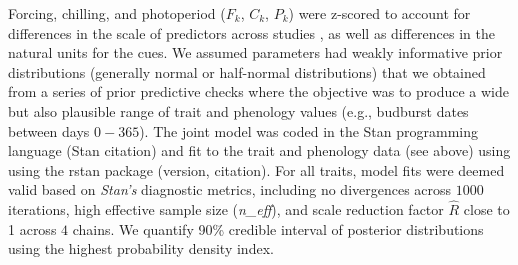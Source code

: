 \documentclass{article}\usepackage[]{graphicx}\usepackage[]{color}
\begin{document}
Forcing, chilling, and photoperiod ($F_k$, $C_k$, $P_k$) were z-scored to account for differences in the scale of predictors across studies \citep{Gelman2006}, as well as differences in the natural units for the cues. We assumed parameters had weakly informative prior distributions (generally normal or half-normal distributions) that we obtained from a series of prior predictive checks where the objective was to produce a wide but also plausible range of trait and phenology values (e.g., budburst dates between days $0-365$). The joint model was coded in the Stan programming language (Stan citation) and fit to the trait and phenology data (see above) using using the rstan package (version, citation). For all traits, model fits were deemed valid based on \textit{Stan's} diagnostic metrics, including no divergences across $1000$ iterations, high effective sample size (\textit{n\_eff}), and scale reduction factor $\hat{R}$ close to 1 across $4$ chains. We quantify 90\% credible interval of posterior distributions using the highest probability density index.   


\end{document}
